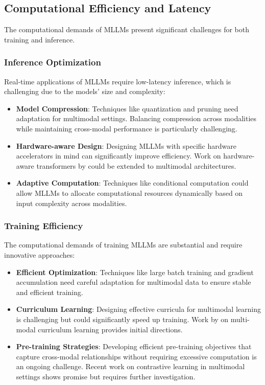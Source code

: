 \subsection{Computational Efficiency and Latency}
The computational demands of MLLMs present significant challenges for both training and inference.

\subsubsection{Inference Optimization}
Real-time applications of MLLMs require low-latency inference, which is challenging due to the models' size and complexity:

\begin{itemize}
    \item \textbf{Model Compression}: Techniques like quantization and pruning \citep{ganesh2021compressing} need adaptation for multimodal settings. Balancing compression across modalities while maintaining cross-modal performance is particularly challenging.
    
    \item \textbf{Hardware-aware Design}: Designing MLLMs with specific hardware accelerators in mind can significantly improve efficiency. Work on hardware-aware transformers by \citet{wang2021spatten} could be extended to multimodal architectures.
    
    \item \textbf{Adaptive Computation}: Techniques like conditional computation \citep{bengio2013estimating} could allow MLLMs to allocate computational resources dynamically based on input complexity across modalities.
\end{itemize}

\subsubsection{Training Efficiency}
The computational demands of training MLLMs are substantial and require innovative approaches:

\begin{itemize}
    \item \textbf{Efficient Optimization}: Techniques like large batch training \citep{you2020large} and gradient accumulation need careful adaptation for multimodal data to ensure stable and efficient training.
    
    \item \textbf{Curriculum Learning}: Designing effective curricula for multimodal learning is challenging but could significantly speed up training. Work by \citet{wang2021multi} on multi-modal curriculum learning provides initial directions.
    
    \item \textbf{Pre-training Strategies}: Developing efficient pre-training objectives that capture cross-modal relationships without requiring excessive computation is an ongoing challenge. Recent work on contrastive learning in multimodal settings \citep{jia2021scaling} shows promise but requires further investigation.
\end{itemize}

